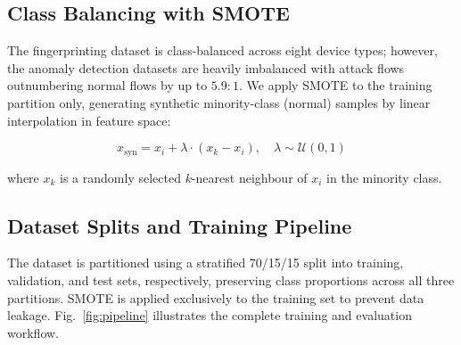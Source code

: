 \documentclass[conference]{IEEEtran}
\begin{document}
\subsection{Class Balancing with SMOTE}

The fingerprinting dataset is class-balanced across eight device types;
however, the anomaly detection datasets are heavily imbalanced with attack
flows outnumbering normal flows by up to $5.9:1$. We apply SMOTE
\cite{chawla2002smote} to the training partition only, generating synthetic
minority-class (normal) samples by linear interpolation in feature space:

\begin{equation}
    x_{\text{syn}} = x_i + \lambda \cdot (x_{k} - x_i), \quad \lambda \sim \mathcal{U}(0,1)
    \label{eq:smote}
\end{equation}

where $x_k$ is a randomly selected $k$-nearest neighbour of $x_i$ in the
minority class.

\subsection{Dataset Splits and Training Pipeline}

The dataset is partitioned using a stratified 70/15/15 split into training,
validation, and test sets, respectively, preserving class proportions across
all three partitions. SMOTE is applied exclusively to the training set to
prevent data leakage. Fig.~\ref{fig:pipeline} illustrates the complete
training and evaluation workflow.
\end{document}
